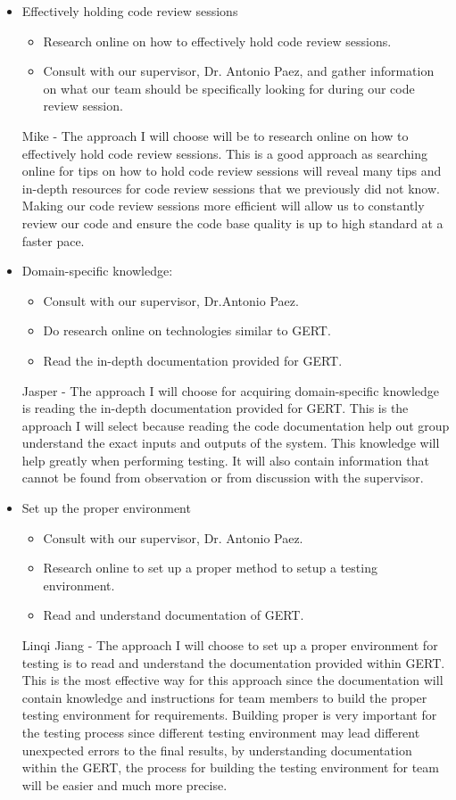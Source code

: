 \documentclass[12pt, titlepage]{article}
\begin{document}
\begin{itemize}
    \item Effectively holding code review sessions
    \begin{itemize}
        \item Research online on how to effectively hold code review sessions.
        \item Consult with our supervisor, Dr. Antonio Paez, and gather information on what our team should be specifically looking for during our code review session.
    \end{itemize}
    Mike - The approach I will choose will be to research online on how to effectively hold code review sessions. This is a good approach as searching online for tips on how to hold code review sessions will reveal many tips and in-depth resources for code review sessions that we previously did not know. Making our code review sessions more efficient will allow us to constantly review our code and ensure the code base quality is up to high standard at a faster pace.
    \item Domain-specific knowledge:
    \begin{itemize}
        \item Consult with our supervisor, Dr.Antonio Paez.
        \item Do research online on technologies similar to GERT.
        \item Read the in-depth documentation provided for GERT.
    \end{itemize}
    Jasper - The approach I will choose for acquiring domain-specific knowledge is reading the in-depth documentation provided for GERT. This is the approach I will select because reading the code documentation help out group understand the exact inputs and outputs of the system. This knowledge will help greatly when performing testing. It will also contain information that cannot be found from observation or from discussion with the supervisor.
    \item Set up the proper environment
    \begin{itemize}
        \item Consult with our supervisor, Dr. Antonio Paez.
        \item Research online to set up a proper method to setup a testing environment.
        \item Read and understand documentation of GERT.
    \end{itemize}
    Linqi Jiang - The approach I will choose to set up a proper environment for testing is to read and understand the documentation provided within GERT. This is the most effective way for this approach since the documentation will contain knowledge and instructions for team members to build the proper testing environment for requirements. Building proper is very important for the testing process since different testing environment may lead different unexpected errors to the final results, by understanding documentation within the GERT, the process for building the testing environment for team will be easier and much more precise.
\end{itemize}
\end{document}
